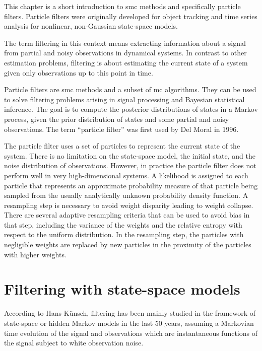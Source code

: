 This chapter is a short introduction to \gls{smc} methods and specifically particle filters. Particle filters were originally developed for object tracking and time series analysis for nonlinear, non-Gaussian state-space models.\cite{Gordon1993}

The term filtering in this context means extracting information about a signal from partial and noisy observations in dynamical systems. In contrast to other estimation problems, filtering is about estimating the current state of a system given only observations up to this point in time.\cite{AppliedOptimalEstimation}

Particle filters are \gls{smc} methods and a subset of \gls{mc} algorithms. They can be used to solve filtering problems arising in signal processing and Bayesian statistical inference. The goal is to compute the posterior distributions of states in a Markov process, given the prior distribution of states and some partial and noisy observations. The term ``particle filter'' was first used by Del Moral in 1996.\cite{Moral1996}

The particle filter uses a set of particles to represent the current state of the system. There is no limitation on the state-space model, the initial state, and the noise distribution of observations.\cite{Moral1996} However, in practice the particle filter does not perform well in very high-dimensional systems. A likelihood is assigned to each particle that represents an approximate probability measure of that particle being sampled from the usually analytically unknown probability density function. A resampling step is necessary to avoid weight disparity leading to weight collapse. There are several adaptive resampling criteria that can be used to avoid bias in that step, including the variance of the weights and the relative entropy with respect to the uniform distribution.\cite{Moral2012} In the resampling step, the particles with negligible weights are replaced by new particles in the proximity of the particles with higher weights.

\section{Filtering with state-space models}

According to Hans Künsch\cite{Kuensch2013}, filtering has been mainly studied in the framework of state-space or hidden Markov models in the last 50 years, assuming a Markovian time evolution of the signal and observations which are instantaneous functions of the signal subject to white observation noise.

